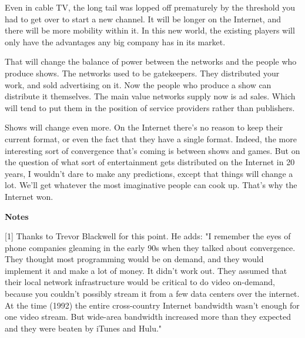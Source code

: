 Even in cable TV, the long tail was
                  lopped off prematurely by the threshold you had to get over to
                  start a new channel. It will be longer on the Internet, and
                  there will be more mobility within it. In this new world, the
                  existing players will only have the advantages any big company
                  has in its market.

That will change the balance of
                  power between the networks and the people who produce shows.
                  The networks used to be gatekeepers. They distributed your
                  work, and sold advertising on it. Now the people who produce a
                  show can distribute it themselves. The main value networks
                  supply now is ad sales. Which will tend to put them in the
                  position of service providers rather than publishers.

Shows
                  will change even more. On the Internet there's no reason to
                  keep their current format, or even the fact that they have a
                  single format. Indeed, the more interesting sort of
                  convergence that's coming is between shows and games. But on
                  the question of what sort of entertainment gets distributed on
                  the Internet in 20 years, I wouldn't dare to make any
                  predictions, except that things will change a lot. We'll get
                  whatever the most imaginative people can cook up. That's why
                  the Internet won.






                  \textbf{Notes}

[1] Thanks to Trevor Blackwell for this point. He adds: "I
                  remember the eyes of phone companies gleaming in the early 90s
                  when they talked about convergence. They thought most
                  programming would be on demand, and they would implement it
                  and make a lot of money. It didn't work out. They assumed that
                  their local network infrastructure would be critical to do
                  video on-demand, because you couldn't possibly stream it from
                  a few data centers over the internet. At the time (1992) the
                  entire cross-country Internet bandwidth wasn't enough for one
                  video stream. But wide-area bandwidth increased more than they
                  expected and they were beaten by iTunes and Hulu."

